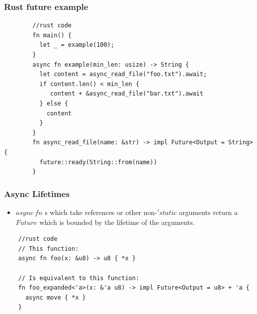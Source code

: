 \begin{frame}[fragile]
    \frametitle{Rust future example}
    \small
    \begin{block}{}
        \begin{verbatim}
        //rust code
        fn main() {
          let _ = example(100);
        }        
        async fn example(min_len: usize) -> String {
          let content = async_read_file("foo.txt").await;
          if content.len() < min_len {
             content + &async_read_file("bar.txt").await
          } else {
            content
          }
        }        
        fn async_read_file(name: &str) -> impl Future<Output = String> {
          future::ready(String::from(name))
        }
        \end{verbatim}
    \end{block}
\end{frame}

\begin{frame}[fragile]
    \frametitle{Async Lifetimes}
    \begin{itemize}
        \item \(async\ fn\) s which take references or other non-\('static\) arguments return a \(Future\) which is bounded by the lifetime of the arguments.
    \end{itemize}
    \begin{block}{}
        \begin{verbatim}
    //rust code
    // This function:
    async fn foo(x: &u8) -> u8 { *x }
    
    // Is equivalent to this function:
    fn foo_expanded<'a>(x: &'a u8) -> impl Future<Output = u8> + 'a {
      async move { *x }
    }
        \end{verbatim}
    \end{block}
 
\end{frame}

